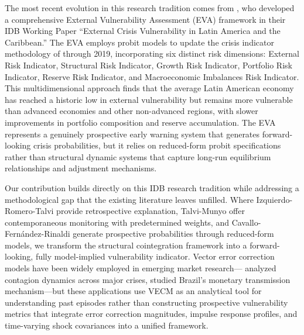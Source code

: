\documentclass[12pt,a4paper]{article}
\numberwithin{equation}{section}
\theoremstyle{definition}
\theoremstyle{remark}
\begin{document}
The most recent evolution in this research tradition comes from \textcite{cavallo2023external}, who developed a comprehensive External Vulnerability Assessment (EVA) framework in their IDB Working Paper ``External Crisis Vulnerability in Latin America and the Caribbean.'' The EVA employs probit models to update the crisis indicator methodology of \textcite{catao2014external} through 2019, incorporating six distinct risk dimensions: External Risk Indicator, Structural Risk Indicator, Growth Risk Indicator, Portfolio Risk Indicator, Reserve Risk Indicator, and Macroeconomic Imbalances Risk Indicator. This multidimensional approach finds that the average Latin American economy has reached a historic low in external vulnerability but remains more vulnerable than advanced economies and other non-advanced regions, with slower improvements in portfolio composition and reserve accumulation. The EVA represents a genuinely prospective early warning system that generates forward-looking crisis probabilities, but it relies on reduced-form probit specifications rather than structural dynamic systems that capture long-run equilibrium relationships and adjustment mechanisms.

Our contribution builds directly on this IDB research tradition while addressing a methodological gap that the existing literature leaves unfilled. Where Izquierdo-Romero-Talvi provide retrospective explanation, Talvi-Munyo offer contemporaneous monitoring with predetermined weights, and Cavallo-Fernández-Rinaldi generate prospective probabilities through reduced-form models, we transform the structural cointegration framework into a forward-looking, fully model-implied vulnerability indicator. Vector error correction models have been widely employed in emerging market research---\textcite{kenourgios2011financial} analyzed contagion dynamics across major crises, \textcite{demello2010bank} studied Brazil's monetary transmission mechanism---but these applications use VECM as an analytical tool for understanding past episodes rather than constructing prospective vulnerability metrics that integrate error correction magnitudes, impulse response profiles, and time-varying shock covariances into a unified framework.


\end{document}
